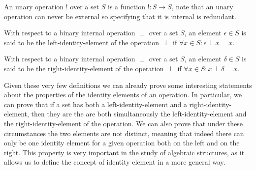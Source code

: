 \begin{definition}
    An unary operation $!$ over a set $S$ is a function $!: S \rightarrow S$, note that 
    an unary operation can never be external so specifying that it is internal is redundant.
\end{definition}

\begin{definition}
    With respect to a binary internal operation $\perp$ over a set $S$, an element $\epsilon \in S$ is said to be the left-identity-element of 
    the operation $\perp$ if $\forall x \in S: \epsilon \perp x = x$.
\end{definition}

\begin{definition}
    With respect to a binary internal operation $\perp$ over a set $S$, an element $\delta \in S$ is said to be the right-identity-element of 
    the operation $\perp$ if $\forall x \in S: x \perp \delta = x$.
\end{definition}

Given these very few definitions we can already prove some interesting statements about the properties of the identity elements of an operation. In 
particular, we can prove that if a set has both a left-identity-element and a right-identity-element, then they are the are both simultaneously the
left-identity-element and the right-identity-element of the operation. We can also prove that under these circumstances the two elements are not distinct, meaning 
that indeed there can only be one identity element for a given operation both on the left and on the right. This property is very important in the study of algebraic
structures, as it allows us to define the concept of identity element in a more general way.

\newpage

